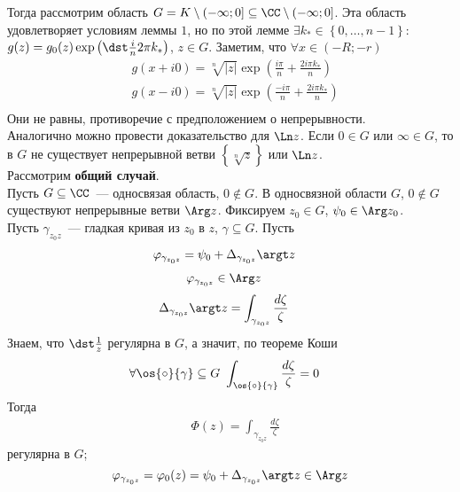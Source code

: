 Тогда рассмотрим область $G = K \setminus \left( -\infty;0 \right]\subseteq \CC
\setminus \left( -\infty; 0 \right]$. Эта область удовлетворяет условиям леммы
$1$, но по этой лемме $\exists k_* \in \left\{ 0, \dots, n-1 \right\}$: $g(z) =
g_0(z)\exp \left( \dst \frac{i}{n} 2 \pi k_* \right)$, $z \in G$. Заметим, что
$\forall x \in \left( -R;-r \right)$
\begin{align*}
& g(x+i0) = \sqrt[n]{\left| z \right|}\exp \left( \frac{i \pi}{n} + \frac{2 i \pi k_*}{n}\right) \\
& g(x-i0) = \sqrt[n]{\left| z \right|}\exp \left( \frac{-i \pi}{n} + \frac{2 i \pi k_*}{n}\right) \\
\end{align*}
Они не равны, противоречие с предположением о непрерывности.
\\
Аналогично можно провести доказательство для $\Ln z$.
\corollary
Если $0 \in G$ или $\infty \in G$, то в $G$ не существует непрерывной ветви
$\left\{ \sqrt[n]{z} \right\}$ или $\Ln z$.
\\
Рассмотрим \textbf{общий случай}.
\\
Пусть $G \subseteq \CC$~--- односвязая область, $0 \not \in G$.
\lemma
В односвязной области $G$, $0 \not \in G$ существуют непрерывные ветви $\Arg z$.
\pr
Фиксируем $z_0 \in G$, $\psi_0 \in \Arg z_0$.
\\
Пусть $\gamma_{z_0z}$~--- гладкая кривая из $z_0$ в $z$, $ \gamma \subseteq G$.
Пусть
\begin{align*}
  & \varphi_{\gamma_{z_0z}} = \psi_0 + \Delta_{\gamma_{z_0z}}\argt z
\end{align*}
\begin{align*}
  & \varphi_{\gamma_{z_0z}} \in \Arg z
\end{align*}
\begin{align*}
  & \Delta_{\gamma_{z_0z}}\argt z = \int_{\gamma_{z_0z}}\frac{d \zeta}{\zeta}
\end{align*}
Знаем, что $\dst \frac{1}{z}$ регулярна в $G$, а значит, по теореме Коши
\begin{align*}
  & \forall \os{\circ}{\gamma} \subseteq G \ \int_{\os{\circ}{\gamma}}\frac{d\zeta}{\zeta} = 0
\end{align*}
Тогда
\begin{align*}
  & \Phi(z) = \int_{\gamma_{z_0z}}\frac{d \zeta}{\zeta}
\end{align*}
регулярна в $G$;
\begin{equation}\label{(15.9)}
    \varphi_{\gamma_{z_0z}} = \varphi_0(z) = \psi_0 + \Delta_{\gamma_{z_0z}}\argt z \in \Arg z
\end{equation}
